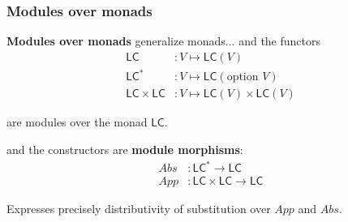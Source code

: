 \documentclass[
serif,
mathsans,
]
{beamer}
\newcommand{\LC}{\mathsf{LC}}
\begin{document}
\begin{frame}
 \frametitle{Modules over monads}
  \begin{block}{\textbf{Modules over monads} generalize monads...}
    and the functors
      \vspace{-1.5em}\begin{align*}
             \LC &: V \mapsto \LC(V)\\
             \LC^* &: V \mapsto \LC(\text{option }V) \\
             \LC\times\LC &: V \mapsto \LC(V) \times \LC(V)
      \end{align*} 
      
      \vspace{-.5em} are modules over the monad $\LC$.
 
  \end{block}

 \begin{block}{and the constructors are \textbf{module morphisms}:}
  \vspace{-1.5em}
     \begin{align*}
                               Abs &: \LC^* \to \LC \\
                    App &: \LC \times \LC  \to \LC
    \end{align*}
    
\vspace{-0.5em}Expresses precisely distributivity of substitution over $App$ and $Abs$.

 \end{block}
\end{frame}
\end{document}
